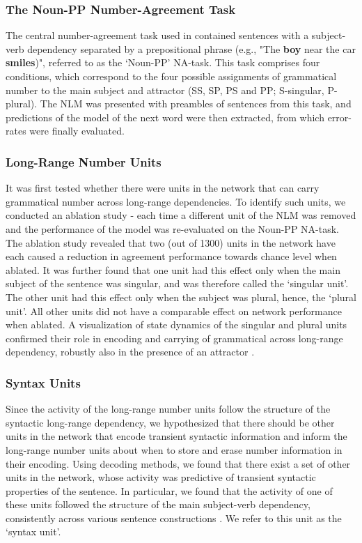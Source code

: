 \subsubsection{The Noun-PP Number-Agreement Task}
The central number-agreement task used in \citet{lakretz2019emergence} contained sentences with a subject-verb dependency separated by a prepositional phrase (e.g., "The \textbf{boy} near the car \textbf{smiles})", referred to as the `Noun-PP' NA-task. This task comprises four conditions, which correspond to the four possible assignments of grammatical number to the main subject and attractor (SS, SP, PS and PP; S-singular, P-plural). The NLM was presented with preambles of sentences from this task, and predictions of the model of the next word were then extracted, from which error-rates were finally evaluated. 

\subsubsection{Long-Range Number Units}
It was first tested whether there were units in the network that can carry grammatical number across long-range dependencies. To identify such units, we conducted an ablation study - each time a different unit of the NLM was removed and the performance of the model was re-evaluated on the Noun-PP NA-task. The ablation study revealed that two (out of 1300) units in the network have each caused a reduction in agreement performance towards chance level when ablated. It was further found that one unit had this effect only when the main subject of the sentence was singular, and was therefore called the `singular unit'. The other unit had this effect only when the subject was plural, hence, the `plural unit'. All other units did not have a comparable effect on network performance when ablated. A visualization of state dynamics of the singular and plural units confirmed their role in encoding and carrying of grammatical across long-range dependency, robustly also in the presence of an attractor \citep[figure 1 in][]{lakretz2019emergence}.

\subsubsection{Syntax Units}
Since the activity of the long-range number units follow the structure of the syntactic long-range dependency, we hypothesized that there should be other units in the network that encode transient syntactic information and inform the long-range number units about when to store and erase number information in their encoding. Using decoding methods, we found that there exist a set of other units in the network, whose activity was predictive of transient syntactic properties of the sentence. In particular, we found that the activity of one of these units followed the structure of the main subject-verb dependency, consistently across various sentence constructions \citep[figure 3 in][]{lakretz2019emergence}. We refer to this unit as the `syntax unit'.


